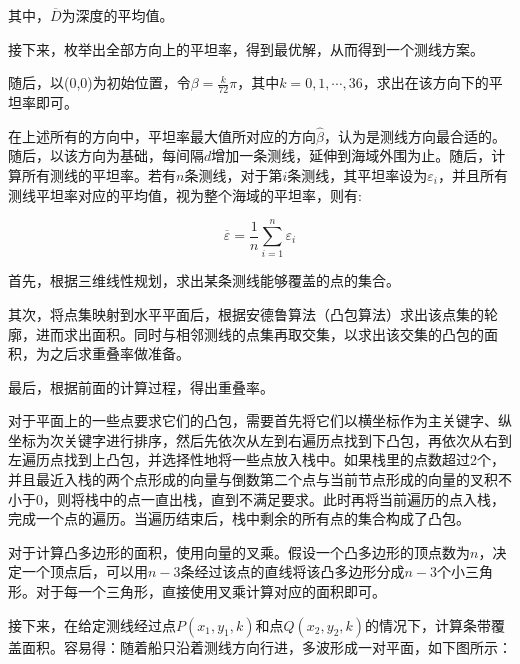 其中，$\overline{D}$为深度的平均值。

接下来，枚举出全部方向上的平坦率，得到最优解，从而得到一个测线方案。

随后，以(0,0)为初始位置，令$\beta = \frac{k}{72}\pi$，其中$k = 0, 1, \cdots, 36$，求出在该方向下的平坦率即可。



在上述所有的方向中，平坦率最大值所对应的方向$\hat \beta$，认为是测线方向最合适的。随后，以该方向为基础，每间隔$d$增加一条测线，延伸到海域外围为止。随后，计算所有测线的平坦率。若有$n$条测线，对于第$i$条测线，其平坦率设为$\varepsilon_i$，并且所有测线平坦率对应的平均值，视为整个海域的平坦率，则有:

\begin{equation}
    \overline{\varepsilon} = \frac{1}{n} \sum^{n}_{i=1}\varepsilon_i
\end{equation}


首先，根据三维线性规划，求出某条测线能够覆盖的点的集合。

其次，将点集映射到水平平面后，根据安德鲁算法（凸包算法）求出该点集的轮廓，进而求出面积。同时与相邻测线的点集再取交集，以求出该交集的凸包的面积，为之后求重叠率做准备。

最后，根据前面的计算过程，得出重叠率。

对于平面上的一些点要求它们的凸包，需要首先将它们以横坐标作为主关键字、纵坐标为次关键字进行排序，然后先依次从左到右遍历点找到下凸包，再依次从右到左遍历点找到上凸包，并选择性地将一些点放入栈中。如果栈里的点数超过2个，并且最近入栈的两个点形成的向量与倒数第二个点与当前节点形成的向量的叉积不小于0，则将栈中的点一直出栈，直到不满足要求。此时再将当前遍历的点入栈，完成一个点的遍历。当遍历结束后，栈中剩余的所有点的集合构成了凸包。

对于计算凸多边形的面积，使用向量的叉乘。假设一个凸多边形的顶点数为$n$，决定一个顶点后，可以用$n-3$条经过该点的直线将该凸多边形分成$n-3$个小三角形。对于每一个三角形，直接使用叉乘计算对应的面积即可。

接下来，在给定测线经过点$P(x_1, y_1, k)$和点$Q(x_2, y_2, k)$的情况下，计算条带覆盖面积。容易得：随着船只沿着测线方向行进，多波形成一对平面，如下图所示：

